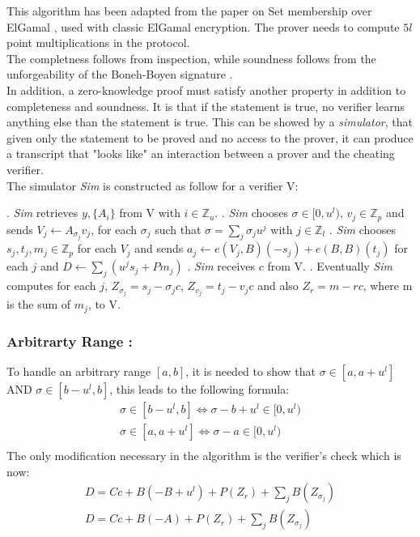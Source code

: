 \documentclass{article}
\begin{document}
This algorithm has been adapted from the paper on Set membership over ElGamal \cite{range}, used with classic ElGamal encryption. The prover needs to compute $5l$ point multiplications in the protocol.\\
The completness follows from inspection, while soundness follows from the unforgeability of the Boneh-Boyen signature \cite{boneh}.\\
In addition, a zero-knowledge proof must satisfy another property in addition to completeness and soundness. It is that if the statement is true, no verifier learns anything else than the statement is true.
This can be showed by a \textit{simulator}, that given only the statement to be proved and no access to the prover, it can produce a transcript that "looks like" an interaction between a prover and the cheating verifier.\\
The simulator \textit{Sim} is constructed as follow for a verifier V:\\

\begin{algorithmic}
. \textit{Sim} retrieves $y,\{A_i\}$ from V with $i \in \mathbb{Z}_u$.
. \textit{Sim} chooses $\sigma \in [0,u^l)$, $v_j \in \mathbb{Z}_p$ and sends $V_j \gets A_{\sigma_j} v_j$, for each $\sigma_j$ such that $\sigma = \sum_{j}{\sigma_j u^j}$ with $ j \in \mathbb{Z}_l$
. \textit{Sim} chooses $s_j,t_j,m_j \in \mathbb{Z}_p$ for each $V_j$ and sends $a_j \gets e(V_j,B)(-s_j) + e(B,B)(t_j)$ for each $j$ and $D \gets \sum_{j}{(u^j s_j + Pm_j)}$
. \textit{Sim} receives $c$ from V.
. Eventually \textit{Sim} computes for each $j$, $Z_{\sigma_j} =s_j - \sigma_j c$, $Z_{v_j} = t_j - v_j c$ and also $Z_r = m - rc$, where m is the sum of $m_j$, to V.  
\end{algorithmic}

\subsubsection*{Arbitrarty Range :}
To handle an arbitrary range $[a,b]$, it is needed to show that $\sigma \in [a,a+u^l]$ AND $ \sigma \in [b-u^l,b]$, this leads to the following formula:\\
\begin{gather*}
 \sigma \in [b-u^l,b] \Longleftrightarrow   \sigma - b + u^l \in [0,u^l) \\
\sigma \in [a,a+u^l] \Longleftrightarrow   \sigma - a  \in [0,u^l)\\
\end{gather*}
The only modification necessary in the algorithm is the verifier's check which is now:
\begin{gather*}
D = Cc+B(-B+u^l)+P(Z_r)+\sum_j{B(Z_{\sigma_j})}\\
D= Cc+B(-A)+P(Z_r)+\sum_j{B(Z_{\sigma_j})}
\end{gather*}
\end{document}
